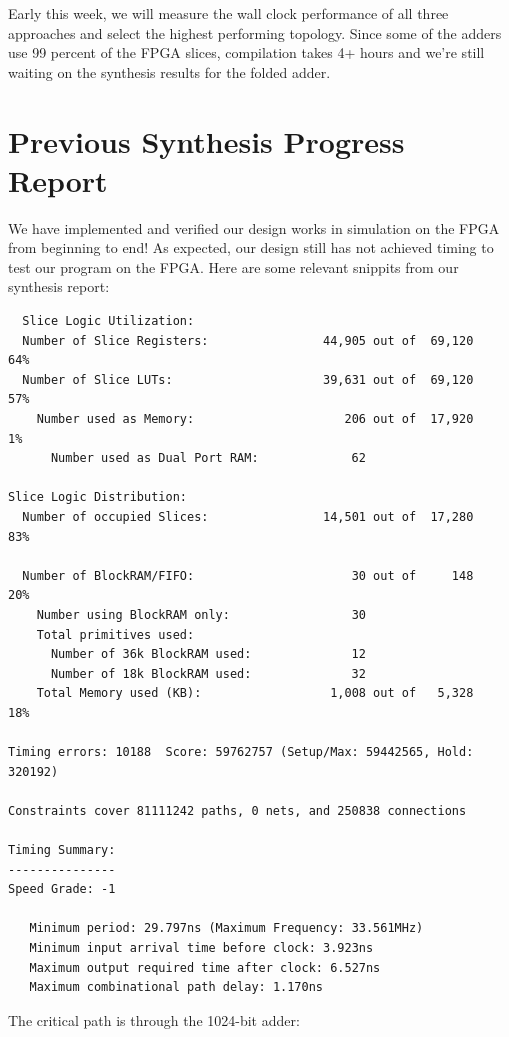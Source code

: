 \documentclass[12pt]{article}
\begin{document}
Early this week, we will measure the wall clock performance of all three approaches
and select the highest performing topology. Since some of the adders use 99 percent of the 
FPGA slices, compilation takes 4+ hours and we're still waiting on the 
synthesis results for the folded adder.


\section{Previous Synthesis Progress Report}

We have implemented and verified our design works in simulation on the FPGA from beginning to end!  As expected, our design still has not achieved timing to test our program on the FPGA.  Here are some relevant snippits from our synthesis report: \
\begin{verbatim}
  Slice Logic Utilization:
  Number of Slice Registers:                44,905 out of  69,120   64%
  Number of Slice LUTs:                     39,631 out of  69,120   57%
    Number used as Memory:                     206 out of  17,920    1%
      Number used as Dual Port RAM:             62

Slice Logic Distribution:
  Number of occupied Slices:                14,501 out of  17,280   83%

  Number of BlockRAM/FIFO:                      30 out of     148   20%
    Number using BlockRAM only:                 30
    Total primitives used:
      Number of 36k BlockRAM used:              12
      Number of 18k BlockRAM used:              32
    Total Memory used (KB):                  1,008 out of   5,328   18%

Timing errors: 10188  Score: 59762757 (Setup/Max: 59442565, Hold: 320192)

Constraints cover 81111242 paths, 0 nets, and 250838 connections

Timing Summary:
---------------
Speed Grade: -1

   Minimum period: 29.797ns (Maximum Frequency: 33.561MHz)
   Minimum input arrival time before clock: 3.923ns
   Maximum output required time after clock: 6.527ns
   Maximum combinational path delay: 1.170ns
\end{verbatim}

The critical path is through the 1024-bit adder:
\end{document}
